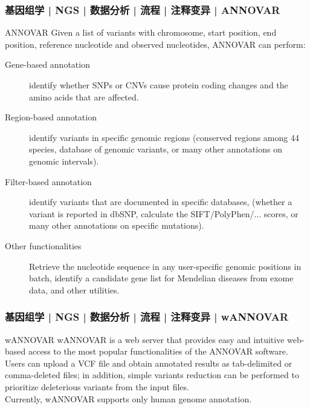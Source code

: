 \begin{frame}
  \frametitle{基因组学 | NGS | 数据分析 | 流程 | 注释变异 | ANNOVAR}
  \begin{block}{ANNOVAR}
    Given a list of variants with chromosome, start position, end position, reference nucleotide and observed nucleotides, ANNOVAR can perform:
    {\footnotesize
      \begin{description}
      \item[Gene-based annotation] identify whether SNPs or CNVs cause protein coding changes and the amino acids that are affected.
      \item[Region-based annotation] identify variants in specific genomic regions (conserved regions among 44 species, database of genomic variants, or many other annotations on genomic intervals).
      \item[Filter-based annotation] identify variants that are documented in specific databases, (whether a variant is reported in dbSNP, calculate the SIFT/PolyPhen/... scores, or many other annotations on specific mutations).
      \item[Other functionalities] Retrieve the nucleotide sequence in any user-specific genomic positions in batch, identify a candidate gene list for Mendelian diseases from exome data, and other utilities.
    \end{description}
    }
  \end{block}
\end{frame}

\begin{frame}
  \frametitle{基因组学 | NGS | 数据分析 | 流程 | 注释变异 | wANNOVAR}
  \begin{block}{wANNOVAR}
  wANNOVAR is a web server that provides easy and intuitive web-based access to the most popular functionalities of the ANNOVAR software.\\
  \vspace{0.5em}
  Users can upload a VCF file and obtain annotated results as tab-delimited or comma-deleted files; in addition, simple variants reduction can be performed to prioritize deleterious variants from the input files.\\
  \vspace{0.5em}
  Currently, wANNOVAR supports only human genome annotation.
  \end{block}
\end{frame}

